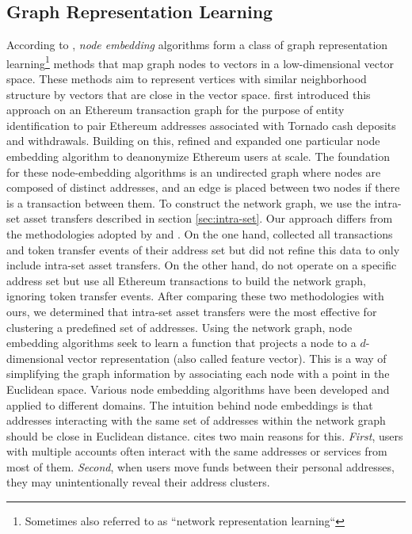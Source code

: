 \documentclass[12pt,a4paper,titlepage,oneside,english]{article}
\begin{document}
\subsection{Graph Representation Learning}
\label{sec:node}
According to \cite{Beres2020}, \textit{node embedding} algorithms form a class of graph representation learning\footnote{Sometimes also referred to as ``network representation learning``} methods that map graph nodes to vectors in a low-dimensional vector space. These methods aim to represent vertices with similar neighborhood structure by vectors that are close in the vector space. \newline
\cite{Beres2020} first introduced this approach on an Ethereum transaction graph for the purpose of entity identification to pair Ethereum addresses associated with Tornado cash deposits and withdrawals. Building on this, \cite{wu2022tutela} refined and expanded one particular node embedding algorithm to deanonymize Ethereum users at scale. \newline
The foundation for these node-embedding algorithms is an undirected graph where nodes are composed of distinct addresses, and an edge is placed between two nodes if there is a transaction between them. \newline
To construct the network graph, we use the intra-set asset transfers described in section \ref{sec:intra-set}. Our approach differs from the methodologies adopted by \cite{Beres2020} and \cite{wu2022tutela}. On the one hand, \cite{Beres2020} collected all transactions and token transfer events of their address set but did not refine this data to only include intra-set asset transfers. On the other hand, \cite{wu2022tutela} do not operate on a specific address set but use all Ethereum transactions to build the network graph, ignoring token transfer events. After comparing these two methodologies with ours, we determined that intra-set asset transfers were the most effective for clustering a predefined set of addresses. %
\newline
Using the network graph, node embedding algorithms seek to learn a function that projects a node to a $d$-dimensional vector representation (also called feature vector). This is a way of simplifying the graph information by associating each node with a point in the Euclidean space. Various node embedding algorithms have been developed and applied to different domains. \citep{rozemberczki2020difftovec} \newline
The intuition behind node embeddings is that addresses interacting with the same set of addresses within the network graph should be close in Euclidean distance. \cite{Beres2020} cites two main reasons for this. \textit{First}, users with multiple accounts often interact with the same addresses or services from most of them. \textit{Second}, when users move funds between their personal addresses, they may unintentionally reveal their address clusters. \newline
\end{document}
